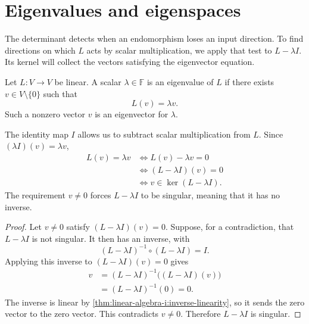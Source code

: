 \section{Eigenvalues and eigenspaces}
\label{sec:linear-algebra-i:eigenvalues-and-eigenspaces}

The determinant detects when an endomorphism loses an input direction.
To find directions on which \(L\) acts by scalar multiplication, we
apply that test to \(L-\lambda I\). Its kernel will collect the
vectors satisfying the eigenvector equation.

\begin{definition}
  Let \(L:V\to V\) be linear. A scalar \(\lambda\in\mathbb F\)
  is an eigenvalue of \(L\) if there exists \(v\in V\setminus\{0\}\)
  such that
  \[
    L(v)=\lambda v.
  \]
  Such a nonzero vector \(v\) is an eigenvector for \(\lambda\).
\end{definition}

The identity map \(I\) allows us to subtract scalar multiplication from
\(L\). Since \((\lambda I)(v)=\lambda v\),
\[
  \begin{aligned}
    L(v)=\lambda v
      &\Longleftrightarrow L(v)-\lambda v=0\\
      &\Longleftrightarrow (L-\lambda I)(v)=0\\
      &\Longleftrightarrow v\in\ker(L-\lambda I).
  \end{aligned}
\]
The requirement \(v\ne0\) forces \(L-\lambda I\) to be singular,
meaning that it has no inverse.

\begin{proof}
  Let \(v\ne0\) satisfy \((L-\lambda I)(v)=0\).
  Suppose, for a contradiction, that \(L-\lambda I\) is not singular.
  It then has an inverse, with
  \[
    (L-\lambda I)^{-1}\circ(L-\lambda I)=I.
  \]
  Applying this inverse to \((L-\lambda I)(v)=0\) gives
  \[
    \begin{aligned}
      v&=(L-\lambda I)^{-1}\bigl((L-\lambda I)(v)\bigr)\\
        &=(L-\lambda I)^{-1}(0)=0.
    \end{aligned}
  \]
  The inverse is linear by
  \autoref{thm:linear-algebra-i:inverse-linearity}, so it sends the zero
  vector to the zero vector. This contradicts \(v\ne0\).
  Therefore \(L-\lambda I\) is singular.
\end{proof}

